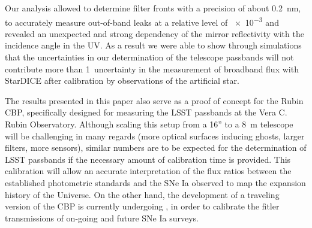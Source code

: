 Our analysis allowed to determine filter fronts with a precision of
about \SI{0.2}{\nano\meter}, to accurately measure out-of-band leaks at a relative
level of \num{e-3} and revealed an unexpected and strong dependency of
the mirror reflectivity with the incidence angle in the UV. As a
result we were able to show through simulations that the uncertainties in our determination of the
telescope passbands will not contribute more than 1\textperthousand\
uncertainty in the measurement of broadband flux with StarDICE after
calibration by observations of the artificial star. 

The results presented in this paper also serve as a proof of concept for the Rubin CBP, specifically designed for measuring the LSST passbands at the Vera C. Rubin Observatory. Although scaling this setup from a 16'' to a \SI{8}{\meter} telescope will be challenging in many regards (more optical surfaces inducing ghosts, larger filters, more sensors), similar numbers are to be expected for the determination of LSST passbands if the necessary amount of calibration time is provided. This calibration will allow an accurate interpretation of the flux ratios between the established photometric standards and the SNe Ia observed to map the expansion history of the Universe. On the other hand, the development of a traveling version of the CBP is currently undergoing \citep{2024RASTI...3..125S}, in order to calibrate the fitler transmissions of on-going and future SNe Ia surveys.

